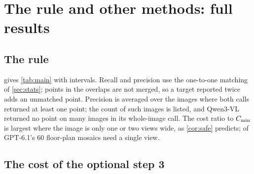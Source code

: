 \section{The rule and other methods: full results}
\label{sec:rule-full}

\subsection{The rule}

 gives \cref{tab:main} with intervals. Recall and precision use the one-to-one matching of \cref{sec:stats}; points in the overlaps are not merged, so a target reported twice adds an unmatched point. Precision is averaged over the images where both calls returned at least one point; the count of such images is listed, and Qwen3-VL returned no point on many images in its whole-image call. The cost ratio to $\Cmin$ is largest where the image is only one or two views wide, as \cref{cor:safe} predicts; \CtOneViewGpt{} of GPT-6.1's 60 floor-plan mosaics need a single view.

\begin{table}[t]
\centering
\footnotesize
\setlength{\tabcolsep}{3pt}
\caption{The rule ($S^\ast = 1.5$, steps 1 and 2 of \cref{alg:rule}) against the whole-image call and the 44 px recipe, with 95\% paired bootstrap intervals over images; bold: interval excludes 0. n/a: recipe not run. Cost: median over images of the rule's tokens over $\Cmin$.}
\label{tab:rule-full}
\end{table}

\subsection{The cost of the optional step 3}
\label{sec:step3}

